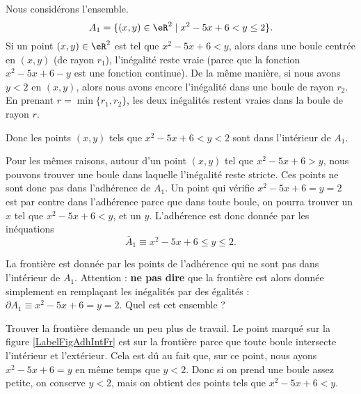 \begin{example} \label{ItemExoEVN3i}
	Nous considérons l'ensemble.
	\begin{equation}
		A_1 = \{ (x, y ) \in \eR^2 \; | \; x^2 - 5x + 6 < y \leq 2 \}.
	\end{equation}
	Si un point $(x,y)\in\eR^2$ est tel que $x^2-5x+6<y$, alors dans une boule centrée en $(x,y)$ (de rayon $r_1$), l'inégalité reste vraie (parce que la fonction $x^2-5x+6-y$ est une fonction continue). De la même manière, si nous avons $y<2$ en $(x,y)$, alors nous avons encore l'inégalité dans une boule de rayon $r_2$. En prenant $r=\min\{ r_1,r_2 \}$, les deux inégalités restent vraies dans la boule de rayon $r$.

	Donc les points $(x,y)$ tels que $x^2 - 5x + 6 < y < 2$ sont dans l'intérieur de $A_1$.

	Pour les mêmes raisons, autour d'un point $(x,y)$ tel que $x^2-5x+6>y$, nous pouvons trouver une boule dans laquelle l'inégalité reste stricte. Ces points ne sont donc pas dans l'adhérence de $A_1$. Un point qui vérifie $x^2-5x+6= y= 2$ est par contre dans l'adhérence parce que dans toute boule, on pourra trouver un $x$ tel que $x^2-5x+6<y$, et un $y$. L'adhérence est donc donnée par les inéquations
	\begin{equation}
		\bar A_1\equiv x^2-5x+6\leq y\leq 2.
	\end{equation}

	La frontière est donnée par les points de l'adhérence qui ne sont pas dans l'intérieur de $A_1$. Attention : {\bf ne pas dire} que la frontière est alors donnée simplement en remplaçant les inégalités par des égalités : $\partial A_1\equiv x^2-5x+6= y= 2$. Quel est cet ensemble ?

	Trouver la frontière demande un peu plus de travail. Le point marqué sur la figure \ref{LabelFigAdhIntFr} est sur la frontière parce que toute boule intersecte l'intérieur et l'extérieur. Cela est dû au fait que, sur ce point, nous ayons $x^2-5x+6=y$ en même temps que $y<2$. Donc si on prend une boule assez petite, on conserve $y<2$, mais on obtient des points tels que $x^2-5x+6<y$.


\end{example}
